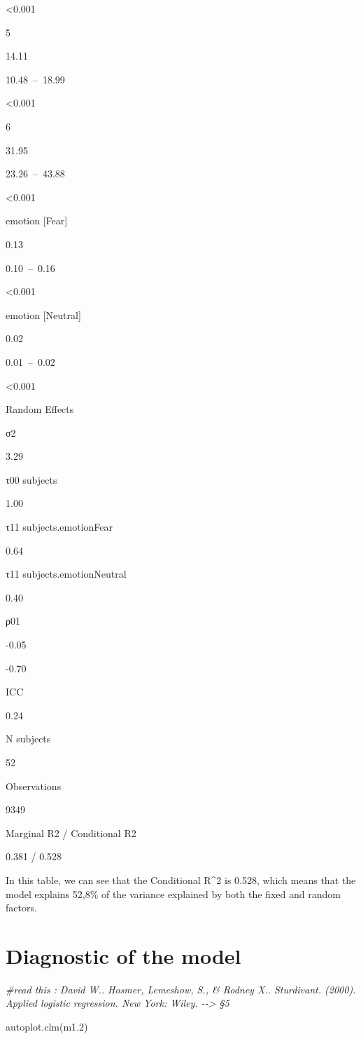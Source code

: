 \documentclass[
]{article}
\newenvironment{Shaded}{\begin{snugshade}}{\end{snugshade}}
\newcommand{\CommentTok}[1]{\textcolor[rgb]{0.56,0.35,0.01}{\textit{#1}}}
\newcommand{\FloatTok}[1]{\textcolor[rgb]{0.00,0.00,0.81}{#1}}
\newcommand{\FunctionTok}[1]{\textcolor[rgb]{0.00,0.00,0.00}{#1}}
\newcommand{\NormalTok}[1]{#1}
\begin{document}
\textless0.001

5

14.11

10.48~--~18.99

\textless0.001

6

31.95

23.26~--~43.88

\textless0.001

emotion {[}Fear{]}

0.13

0.10~--~0.16

\textless0.001

emotion {[}Neutral{]}

0.02

0.01~--~0.02

\textless0.001

Random Effects

σ2

3.29

τ00 subjects

1.00

τ11 subjects.emotionFear

0.64

τ11 subjects.emotionNeutral

0.40

ρ01

-0.05

-0.70

ICC

0.24

N subjects

52

Observations

9349

Marginal R2 / Conditional R2

0.381 / 0.528

In this table, we can see that the Conditional R\^{}2 is 0.528, which
means that the model explains 52,8\% of the variance explained by both
the fixed and random factors.

\hypertarget{diagnostic-of-the-model}{%
\section{Diagnostic of the model}\label{diagnostic-of-the-model}}

\begin{Shaded}
\begin{Highlighting}[]
\CommentTok{\#read this : David W.. Hosmer, Lemeshow, S., \& Rodney X.. Sturdivant. (2000). Applied logistic regression. New York: Wiley. {-}{-}\textgreater{} §5}

\FunctionTok{autoplot.clm}\NormalTok{(m1}\FloatTok{.2}\NormalTok{)}
\end{Highlighting}
\end{Shaded}
\end{document}
